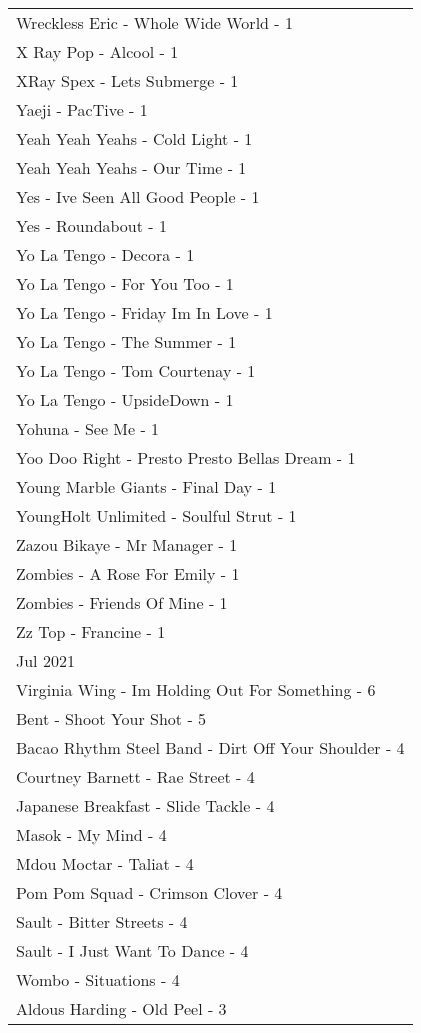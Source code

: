 \documentclass[
]{article}
\begin{document}
\begin{longtable}{l}
Wreckless Eric - Whole Wide World - 1 \\ 
X Ray Pop - Alcool - 1 \\ 
XRay Spex - Lets Submerge - 1 \\ 
Yaeji - PacTive - 1 \\ 
Yeah Yeah Yeahs - Cold Light - 1 \\ 
Yeah Yeah Yeahs - Our Time - 1 \\ 
Yes - Ive Seen All Good People - 1 \\ 
Yes - Roundabout - 1 \\ 
Yo La Tengo - Decora - 1 \\ 
Yo La Tengo - For You Too - 1 \\ 
Yo La Tengo - Friday Im In Love - 1 \\ 
Yo La Tengo - The Summer - 1 \\ 
Yo La Tengo - Tom Courtenay - 1 \\ 
Yo La Tengo - UpsideDown - 1 \\ 
Yohuna - See Me - 1 \\ 
Yoo Doo Right - Presto Presto Bellas Dream - 1 \\ 
Young Marble Giants - Final Day - 1 \\ 
YoungHolt Unlimited - Soulful Strut - 1 \\ 
Zazou Bikaye - Mr Manager - 1 \\ 
Zombies - A Rose For Emily - 1 \\ 
Zombies - Friends Of Mine - 1 \\ 
Zz Top - Francine - 1 \\ 
\midrule
\multicolumn{1}{l}{Jul 2021} \\ 
\midrule
Virginia Wing - Im Holding Out For Something - 6 \\ 
Bent - Shoot Your Shot - 5 \\ 
Bacao Rhythm Steel Band - Dirt Off Your Shoulder - 4 \\ 
Courtney Barnett - Rae Street - 4 \\ 
Japanese Breakfast - Slide Tackle - 4 \\ 
Masok - My Mind - 4 \\ 
Mdou Moctar - Taliat - 4 \\ 
Pom Pom Squad - Crimson Clover - 4 \\ 
Sault - Bitter Streets - 4 \\ 
Sault - I Just Want To Dance - 4 \\ 
Wombo - Situations - 4 \\ 
Aldous Harding - Old Peel - 3 \\ 

\end{longtable}
\end{document}
